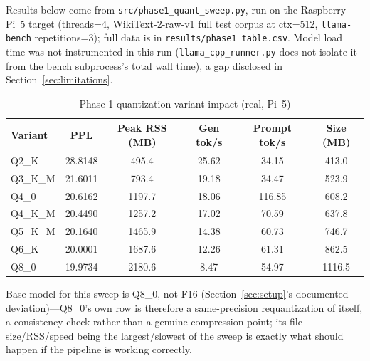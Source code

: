 \documentclass[journal]{IEEEtran}
\begin{document}
Results below come from \texttt{src/phase1\_quant\_sweep.py}, run on the Raspberry Pi~5 target (threads=4, WikiText-2-raw-v1 full test corpus at ctx=512, \texttt{llama-bench} repetitions=3); full data is in \texttt{results/phase1\_table.csv}. Model load time was not instrumented in this run (\texttt{llama\_cpp\_runner.py} does not isolate it from the bench subprocess's total wall time), a gap disclosed in Section~\ref{sec:limitations}.

\begin{table}[t]
\caption{Phase 1 quantization variant impact (real, Pi~5)}
\label{tab:phase1-impact}
\centering
\footnotesize
\begin{tabular}{@{}lccccc@{}}
\toprule
Variant & PPL & Peak RSS (MB) & Gen tok/s & Prompt tok/s & Size (MB) \\
\midrule
Q2\_K    & 28.8148 & 495.4  & 25.62 & 34.15  & 413.0 \\
Q3\_K\_M & 21.6011 & 793.4  & 19.18 & 34.47  & 523.9 \\
Q4\_0    & 20.6162 & 1197.7 & 18.06 & 116.85 & 608.2 \\
Q4\_K\_M & 20.4490 & 1257.2 & 17.02 & 70.59  & 637.8 \\
Q5\_K\_M & 20.1640 & 1465.9 & 14.38 & 60.73  & 746.7 \\
Q6\_K    & 20.0001 & 1687.6 & 12.26 & 61.31  & 862.5 \\
Q8\_0    & 19.9734 & 2180.6 & 8.47  & 54.97  & 1116.5 \\
\bottomrule
\end{tabular}
\end{table}

Base model for this sweep is Q8\_0, not F16 (Section~\ref{sec:setup}'s documented deviation)---Q8\_0's own row is therefore a same-precision requantization of itself, a consistency check rather than a genuine compression point; its file size/RSS/speed being the largest/slowest of the sweep is exactly what should happen if the pipeline is working correctly.
\end{document}
